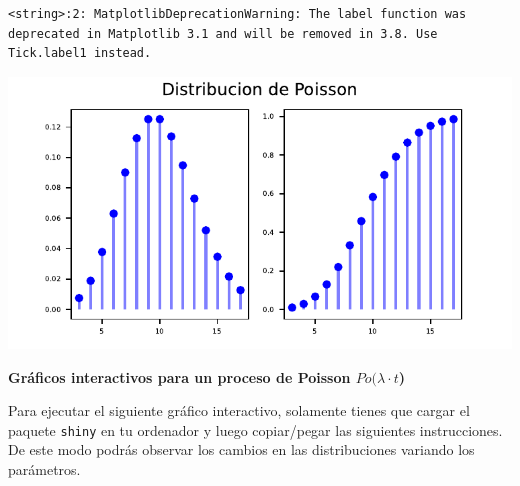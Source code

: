 \documentclass[
  letterpaper,
  DIV=11,
  numbers=noendperiod]{scrreprt}
\begin{document}
\begin{verbatim}
<string>:2: MatplotlibDeprecationWarning: The label function was deprecated in Matplotlib 3.1 and will be removed in 3.8. Use Tick.label1 instead.
\end{verbatim}

\includegraphics{3_files/figure-pdf/py_poiss2-1.pdf}

\textbf{Gráficos interactivos para un proceso de Poisson
\(Po(\lambda\cdot t\))}

Para ejecutar el siguiente gráfico interactivo, solamente tienes que
cargar el paquete \texttt{shiny} en tu ordenador y luego copiar/pegar
las siguientes instrucciones. De este modo podrás observar los cambios
en las distribuciones variando los parámetros.
\end{document}
